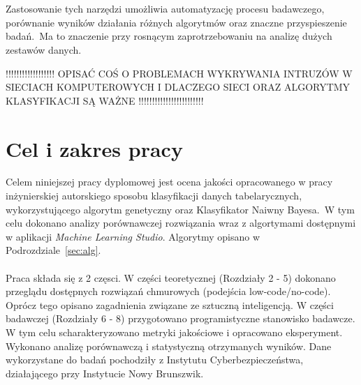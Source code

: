 \\ \\
Zastosowanie tych narzędzi umożliwia automatyzację procesu badawczego, porównanie wyników działania różnych algorytmów oraz znaczne przyspieszenie badań.\ Ma to znaczenie przy rosnącym zaprotrzebowaniu na analizę dużych zestawów danych.



!!!!!!!!!!!!!!!!!!
OPISAĆ COŚ O PROBLEMACH WYKRYWANIA INTRUZÓW W SIECIACH KOMPUTEROWYCH I DLACZEGO SIECI ORAZ ALGORYTMY KLASYFIKACJI SĄ WAŻNE
!!!!!!!!!!!!!!!!!!!!!!!!



\section{Cel i zakres pracy}
Celem niniejszej pracy dyplomowej jest ocena jakości opracowanego w pracy inżynierskiej autorskiego sposobu klasyfikacji danych tabelarycznych, wykorzystującego algorytm genetyczny oraz Klasyfikator Naiwny Bayesa.\ W tym celu dokonano analizy porównawczej rozwiązania wraz z algortymami dostępnymi w aplikacji \textit{Machine Learning Studio}. Algorytmy opisano w Podrozdziale~\ref{sec:alg}.
\\ \\
Praca składa się z 2 częsci. W części teoretycznej (Rozdziały 2 - 5) dokonano przeglądu dostępnych rozwiązań chmurowych (podejścia low-code/no-code). Oprócz tego opisano zagadnienia związane ze sztuczną inteligencją. W części badawczej (Rozdziały 6 - 8) przygotowano programistyczne stanowisko badawcze. W tym celu scharakteryzowano metryki jakościowe i opracowano eksperyment. Wykonano analizę porównawczą i statystyczną otrzymanych wyników. Dane wykorzystane do badań pochodziły z Instytutu Cyberbezpieczeństwa, działającego przy Instytucie Nowy Brunszwik.
